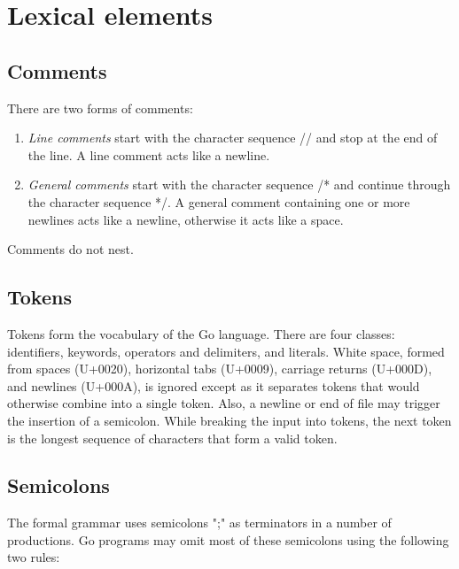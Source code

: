 \documentclass{article}
\begin{document}
\section*{Lexical elements}

\subsection*{Comments}
There are two forms of comments:

\begin{enumerate}
  \item \textit{Line comments} start with the character sequence
  // and stop at the end of the line. A line comment acts like a
  newline.
  
  \item \textit{General comments} start with the character
  sequence /* and continue through the character sequence */. A
  general comment containing one or more newlines acts like a
  newline, otherwise it acts like a space.
\end{enumerate}

Comments do not nest.

\subsection*{Tokens}
Tokens form the vocabulary of the Go language. There are four
classes: identifiers, keywords, operators and delimiters, and
literals. White space, formed from spaces (U+0020), horizontal tabs
(U+0009), carriage returns (U+000D), and newlines (U+000A), is
ignored except as it separates tokens that would otherwise combine
into a single token. Also, a newline or end of file may trigger the
insertion of a semicolon. While breaking the input into tokens, the
next token is the longest sequence of characters that form a valid
token.

\subsection*{Semicolons}
The formal grammar uses semicolons ";" as terminators in a number
of productions. Go programs may omit most of these semicolons using
the following two rules:
\end{document}
